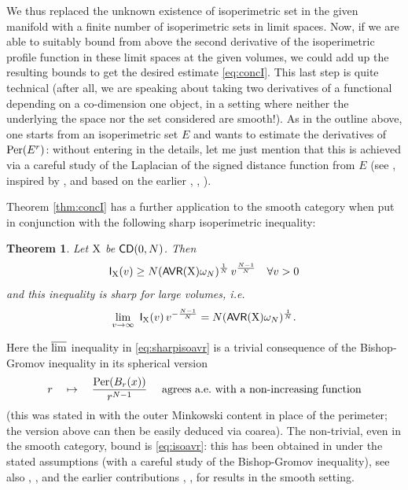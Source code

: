 \documentclass[11pt]{article}
\numberwithin{equation}{section}
\newtheorem{theorem}{Theorem}[section]
\newcommand{\X}{{\rm X}}
\newcommand{\CD}{{\sf CD}}
\newcommand{\lims}{\varlimsup}
\newcommand{\AVR}{{\sf AVR}}
\begin{document}
We thus replaced the unknown existence of isoperimetric set in the given manifold with a finite number of isoperimetric sets in limit spaces. Now, if we are able to suitably bound from above the second derivative of the isoperimetric profile function in these limit spaces at the given volumes, we could add up the resulting bounds to get the desired estimate \eqref{eq:concI}.  This last step is quite technical (after all, we are speaking about taking two derivatives of a functional depending on a co-dimension one object, in a setting where neither the underlying the space nor the set considered are  smooth!). As in the outline above, one starts from an isoperimetric set $E$ and wants to estimate  the derivatives of ${\rm Per}(E^r)$: without entering in the details, let me just mention that this is achieved via a careful study of the Laplacian of the signed distance function from $E$ (see \cite{APPS22b}, inspired by \cite{CafCor95}, \cite{Petrunin03} and  based on the earlier \cite{MS21}, \cite{CavMon20}, \cite{Gigli12}).

\medskip

Theorem \ref{thm:concI} has a further application to the smooth category when put in conjunction with the following sharp isoperimetric inequality:
\begin{theorem}\label{thm:sharpisoavr}
Let $\X$ be $\CD(0,N)$. Then 
\begin{equation}
\label{eq:isoavr}
{\sf I}_\X(v)\geq N(\AVR(\X)\omega_N)^{\frac1N} \,v^{\frac{N-1}N}\quad\forall v>0
\end{equation}
and this inequality is sharp for large volumes, i.e.
\begin{equation}
\label{eq:sharpisoavr}
\lim_{v\to\infty}\ {{\sf I}_\X(v)}\,v^{-\frac{N-1}N} =N(\AVR(\X)\omega_N)^{\frac1N}.
\end{equation}
\end{theorem}
Here the $\lims$ inequality in \eqref{eq:sharpisoavr} is a trivial consequence of the Bishop-Gromov inequality in its spherical version
\[
r\quad\mapsto\quad\frac{{\rm Per}(B_r(x))}{r^{N-1}}\quad\text{ agrees a.e.\ with a non-increasing function}
\]
(this was stated in   \cite[Theorem 2.3]{Sturm06II} with the outer Minkowski content in place of the perimeter; the version above can then be easily deduced via coarea). The non-trivial, even in the smooth category, bound is \eqref{eq:isoavr}: this has been obtained in \cite{BalKri23} under the stated assumptions (with a careful study of the Bishop-Gromov inequality), see also \cite{CavMan22},  \cite{AFM18}, \cite{APPS22} and the earlier contributions \cite{CouSal93}, \cite{Bre23}, \cite{Joh21} for results in the smooth setting.
\end{document}
